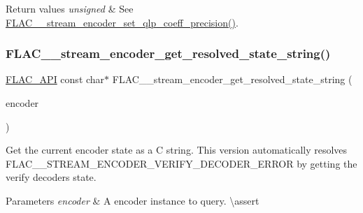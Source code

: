 \begin{DoxyRetVals}{Return values}
{\em unsigned} & See \mbox{\hyperlink{group__flac__stream__encoder_ga0888d739c952ff73456bf90e48634514}{F\+L\+A\+C\+\_\+\+\_\+stream\+\_\+encoder\+\_\+set\+\_\+qlp\+\_\+coeff\+\_\+precision()}}. \\
\hline
\end{DoxyRetVals}
\mbox{\label{group__flac__stream__encoder_gac909fca7b0e2aacaf772f3aa0e42c0db}} 
\subsubsection{\texorpdfstring{FLAC\_\_stream\_encoder\_get\_resolved\_state\_string()}{FLAC\_\_stream\_encoder\_get\_resolved\_state\_string()}}
{\footnotesize\ttfamily \mbox{\hyperlink{group__flac__export_ga56ca07df8a23310707732b1c0007d6f5}{F\+L\+A\+C\+\_\+\+A\+PI}} const char$\ast$ F\+L\+A\+C\+\_\+\+\_\+stream\+\_\+encoder\+\_\+get\+\_\+resolved\+\_\+state\+\_\+string (\begin{DoxyParamCaption}\item[{const \mbox{\hyperlink{struct_f_l_a_c_____stream_encoder}{F\+L\+A\+C\+\_\+\+\_\+\+Stream\+Encoder}} $\ast$}]{encoder }\end{DoxyParamCaption})}

Get the current encoder state as a C string. This version automatically resolves {\ttfamily F\+L\+A\+C\+\_\+\+\_\+\+S\+T\+R\+E\+A\+M\+\_\+\+E\+N\+C\+O\+D\+E\+R\+\_\+\+V\+E\+R\+I\+F\+Y\+\_\+\+D\+E\+C\+O\+D\+E\+R\+\_\+\+E\+R\+R\+OR} by getting the verify decoder\textquotesingle{}s state.


\begin{DoxyParams}{Parameters}
{\em encoder} & A encoder instance to query. \textbackslash{}assert 
\begin{DoxyCode}{1}
\end{DoxyCode}
 \\
\hline
\end{DoxyParams}

